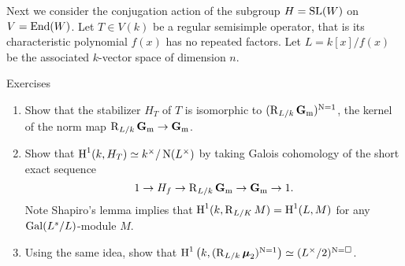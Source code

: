 Next we consider the conjugation action of the subgroup $H=\operatorname{SL}(W)$ 
on $V=\operatorname{End}(W)$. Let $T\in V(k)$ be a regular semisimple operator, that is its 
characteristic polynomial $f(x)$ has no repeated factors. Let $L=k[x]/f(x)$ be 
the associated $k$-vector space of dimension $n$. 

\begin{enonce*}[remark]{Exercises}
\begin{enumerate}
  \item Show that the stabilizer $H_T$ of $T$ is isomorphic to 
    $(\operatorname{R}_{L/k}\mathbf{G}_{\mathrm{m}})^{\operatorname{N}=1}$, the kernel of the norm 
    map $\operatorname{R}_{L/k}\mathbf{G}_{\mathrm{m}}\to\mathbf{G}_{\mathrm{m}}$. 
  \item Show that $\operatorname{H}^1(k,H_T)  \simeq k^\times/\operatorname{N}(L^\times)$ by taking 
    Galois cohomology of the short exact sequence 
    \[
      1 \to H_f \to \operatorname{R}_{L/k}\mathbf{G}_{\mathrm{m}} \to \mathbf{G}_{\mathrm{m}} \to 1 .
    \]
    Note Shapiro's lemma implies that $\operatorname{H}^1(k,\operatorname{R}_{L/K} M) = \operatorname{H}^1(L,M)$ 
    for any $\operatorname{Gal}(L^s/L)$-module $M$. 
  \item Using the same idea, show that 
    $\operatorname{H}^1\left(k,(\operatorname{R}_{L/k}\boldsymbol\mu_2)^{\operatorname{N}=1}\right) \simeq (L^\times/2)^{\operatorname{N}=\square}$. 
\end{enumerate}
\end{enonce*}





